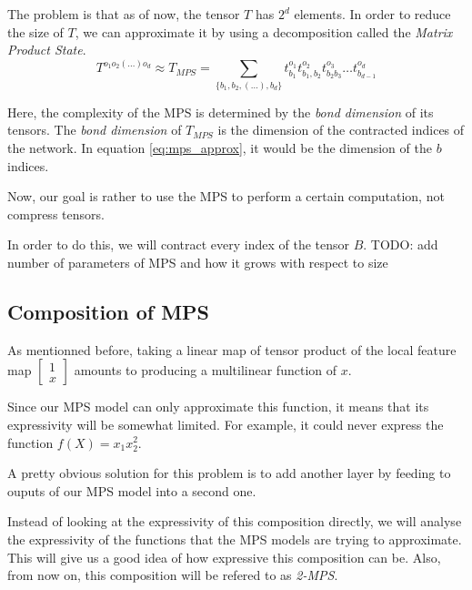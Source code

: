 \documentclass{article}
\theoremstyle{definition}
\theoremstyle{definition}
\begin{document}
\paragraph{} ${}$ \\
The problem is that as of now, the tensor $T$ has $2^{d}$ elements. In order to 
reduce the size of $T$, we can approximate it by using a decomposition called 
the \emph{Matrix Product State}.
\begin{equation} \label{eq:mps_approx}
T^{o_1 o_2 (\dots) o_d} \approx T_{MPS} = 
\sum_{ \{ b_1,b_2,(\dots), b_d \}} t^{o_1}_{b_1} t^{o_2}_{b_1, b_2} t^{o_3}_{b_2 b_3} \dots  t^{o_d}_{ b_{d-1} } 
\end{equation}

Here, the complexity of the MPS is determined by the \emph{bond dimension} of its tensors.
The \emph{bond dimension} of $T_{MPS}$ is the dimension of the contracted indices of the network.
In equation \ref{eq:mps_approx}, it would be the dimension of the $b$ indices.

Now, our goal is rather to use the MPS to perform a certain computation, not compress tensors. 

In order to do this, we will contract every index of the tensor $B$.
TODO: add number of parameters of MPS and how it grows with respect to size

\subsection{Composition of MPS}
As mentionned before, taking a linear map of  tensor product of the local feature map 
$ \begin{bmatrix} 1 \\ x \end{bmatrix} $ amounts to producing a multilinear function of $x$.

Since our MPS model can only approximate this function, it means that its expressivity
will be somewhat limited. For example, it could never express the function $f(X) = x_1x_2^2$.

A pretty obvious solution for this problem is to add another layer by feeding to ouputs of 
our MPS model into a second one.

Instead of looking at the expressivity of this composition directly, we will analyse 
the expressivity of the functions that the MPS models are trying to approximate. This 
will give us a good idea of how expressive this composition can be. Also, from now on,
this composition will be refered to as \emph{2-MPS}.
\end{document}
